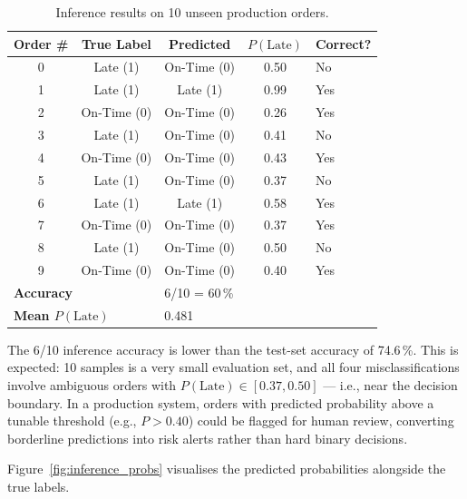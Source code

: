 \documentclass[12pt,a4paper]{article}
\begin{document}
\begin{table}[H]
\centering
\caption{Inference results on 10 unseen production orders.}
\label{tab:inference}
\renewcommand{\arraystretch}{1.25}
\begin{tabular}{ccccl}
\toprule
\textbf{Order \#} & \textbf{True Label} & \textbf{Predicted} & \textbf{$P(\text{Late})$} & \textbf{Correct?} \\
\midrule
0  & Late (1)     & On-Time (0) & 0.50 & \textcolor{svcred}{No}  \\
1  & Late (1)     & Late (1)    & 0.99 & \textcolor{rfgreen}{Yes} \\
2  & On-Time (0)  & On-Time (0) & 0.26 & \textcolor{rfgreen}{Yes} \\
3  & Late (1)     & On-Time (0) & 0.41 & \textcolor{svcred}{No}  \\
4  & On-Time (0)  & On-Time (0) & 0.43 & \textcolor{rfgreen}{Yes} \\
5  & Late (1)     & On-Time (0) & 0.37 & \textcolor{svcred}{No}  \\
6  & Late (1)     & Late (1)    & 0.58 & \textcolor{rfgreen}{Yes} \\
7  & On-Time (0)  & On-Time (0) & 0.37 & \textcolor{rfgreen}{Yes} \\
8  & Late (1)     & On-Time (0) & 0.50 & \textcolor{svcred}{No}  \\
9  & On-Time (0)  & On-Time (0) & 0.40 & \textcolor{rfgreen}{Yes} \\
\midrule
\multicolumn{2}{l}{\textbf{Accuracy}} & \multicolumn{3}{l}{6/10 = 60\,\%} \\
\multicolumn{2}{l}{\textbf{Mean $P(\text{Late})$}} & \multicolumn{3}{l}{0.481} \\
\bottomrule
\end{tabular}
\end{table}

The 6/10 inference accuracy is lower than the test-set accuracy of 74.6\,\%.
This is expected: 10 samples is a very small evaluation set, and all four
misclassifications involve ambiguous orders with $P(\text{Late}) \in [0.37,
0.50]$ --- i.e., near the decision boundary. In a production system, orders
with predicted probability above a tunable threshold (e.g., $P > 0.40$) could
be flagged for human review, converting borderline predictions into risk alerts
rather than hard binary decisions.

Figure~\ref{fig:inference_probs} visualises the predicted probabilities
alongside the true labels.
\end{document}
